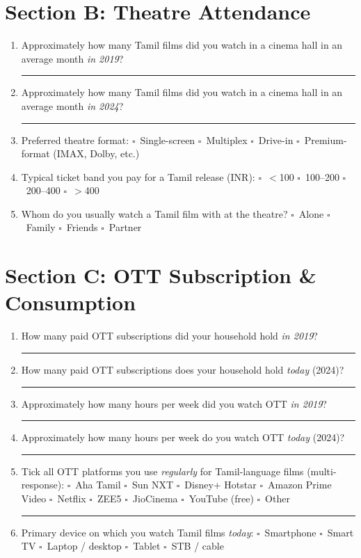 \section*{Section B: Theatre Attendance}
\begin{enumerate}[resume,itemsep=2pt]
  \item Approximately how many Tamil films did you watch in a
        cinema hall in an average month \emph{in 2019}? \rule{2cm}{0.4pt}
  \item Approximately how many Tamil films did you watch in a
        cinema hall in an average month \emph{in 2024}? \rule{2cm}{0.4pt}
  \item Preferred theatre format: $\square$~Single-screen \quad
        $\square$~Multiplex \quad $\square$~Drive-in \quad
        $\square$~Premium-format (IMAX, Dolby, etc.)
  \item Typical ticket band you pay for a Tamil release (INR):
        $\square$~$<$100 \quad $\square$~100--200 \quad
        $\square$~200--400 \quad $\square$~$>$400
  \item Whom do you usually watch a Tamil film with at the theatre?
        $\square$~Alone \quad $\square$~Family \quad $\square$~Friends
        \quad $\square$~Partner
\end{enumerate}

\section*{Section C: OTT Subscription \& Consumption}
\begin{enumerate}[resume,itemsep=2pt]
  \item How many paid OTT subscriptions did your household hold
        \emph{in 2019}? \rule{2cm}{0.4pt}
  \item How many paid OTT subscriptions does your household hold
        \emph{today} (2024)? \rule{2cm}{0.4pt}
  \item Approximately how many hours per week did you watch OTT
        \emph{in 2019}? \rule{2cm}{0.4pt}
  \item Approximately how many hours per week do you watch OTT
        \emph{today} (2024)? \rule{2cm}{0.4pt}
  \item Tick all OTT platforms you use \emph{regularly} for
        Tamil-language films (multi-response):
        $\square$~Aha Tamil \quad $\square$~Sun NXT \quad
        $\square$~Disney+ Hotstar \quad $\square$~Amazon Prime Video \quad
        $\square$~Netflix \quad $\square$~ZEE5 \quad $\square$~JioCinema
        \quad $\square$~YouTube (free) \quad $\square$~Other
        \rule{2cm}{0.4pt}
  \item Primary device on which you watch Tamil films \emph{today}:
        $\square$~Smartphone \quad $\square$~Smart TV \quad
        $\square$~Laptop / desktop \quad $\square$~Tablet \quad
        $\square$~STB / cable
\end{enumerate}

